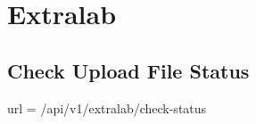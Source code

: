     \section{Extralab}
            
        \subsection{Check Upload File Status}
            url = /api/v1/extralab/check-status
            
            
            
    
    